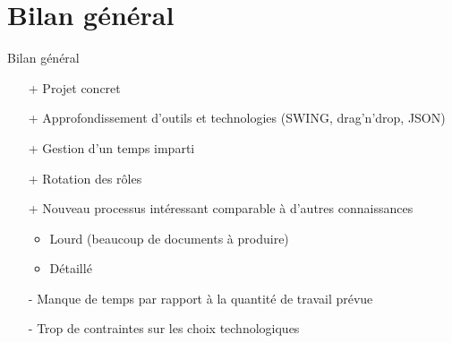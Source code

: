 \section{Bilan général}
\begin{frame}{Bilan général}
\begin{itemize}
	\item[+] Projet concret
	\item[+] Approfondissement d'outils et technologies (SWING, drag'n'drop, JSON)
	\item[+] Gestion d'un temps imparti
	\item[+] Rotation des rôles
	\item[+] Nouveau processus intéressant comparable à d'autres connaissances
	\begin{itemize}
		\item Lourd (beaucoup de documents à produire)
		\item Détaillé
	\end{itemize}
	\item[-] Manque de temps par rapport à la quantité de travail prévue
	\item[-] Trop de contraintes sur les choix technologiques
\end{itemize}
\end{frame}
